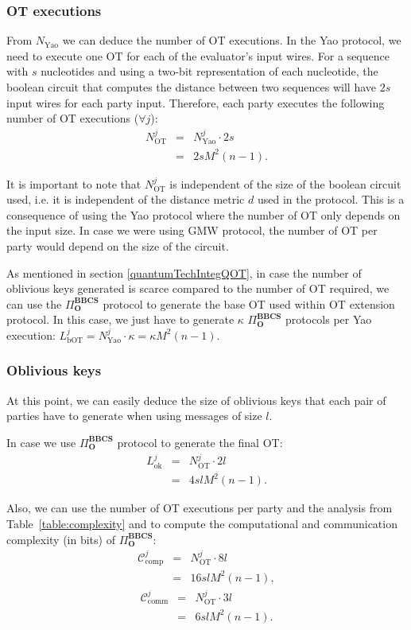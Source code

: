 \subsubsection{OT executions}
From $N_{\text{Yao}}$ we can deduce the number of OT executions. In the Yao protocol, we need to execute one OT for each of the evaluator's input wires. For a sequence with $s$ nucleotides and using a two-bit representation of each nucleotide, the boolean circuit that computes the distance between two sequences will have $2s$ input wires for each party input. Therefore, each party executes the following number of OT executions ($\forall j$):
\begin{eqnarray*}
N_{\text{OT}}^j &=& N^j_\text{Yao} \cdot 2s \\
&=& 2sM^2(n-1).
\end{eqnarray*}

It is important to note that $N_{\text{OT}}^j$ is independent of the size of the boolean circuit used, i.e. it is independent of the distance metric $d$ used in the protocol. This is a consequence of using the Yao protocol where the number of OT only depends on the input size. In case we were using GMW \cite{Goldreich87} protocol, the number of OT per party would depend on the size of the circuit.

As mentioned in section \ref{quantumTechIntegQOT}, in case the number of oblivious keys generated is scarce compared to the number of OT required, we can use the $\Pi^{\textbf{BBCS}}_{\textbf{O}}$ protocol to generate the base OT used within OT extension protocol. In this case, we just have to generate $\kappa$ $\Pi^{\textbf{BBCS}}_{\textbf{O}}$ protocols per Yao execution: $L^j_\text{bOT} = N^j_\text{Yao} \cdot \kappa = \kappa M^2(n-1)$.

\subsubsection{Oblivious keys}
At this point, we can easily deduce the size of oblivious keys that each pair of parties have to generate when using messages of size $l$. 

In case we use $\Pi^{\textbf{BBCS}}_{\textbf{O}}$ protocol to generate the final OT:
\begin{eqnarray*}
L^j_{\text{ok}} &=& N_{\text{OT}}^j \cdot 2l \\
&=& 4slM^2(n-1).
\end{eqnarray*}

Also, we can use the number of OT executions per party and the analysis from Table~\ref{table:complexity} and \cite{SPM21} to compute the computational and communication complexity (in bits) of $\Pi^{\textbf{BBCS}}_{\textbf{O}}$:
\begin{eqnarray*}
\mathcal{C}^j_{\text{comp}} &=&  N_{\text{OT}}^j \cdot 8l \\
&=& 16 slM^2(n-1),
\end{eqnarray*}
\begin{eqnarray*}
\mathcal{C}^j_{\text{comm}} &=&  N_{\text{OT}}^j \cdot 3l \\
&=& 6 slM^2(n-1).
\end{eqnarray*}

